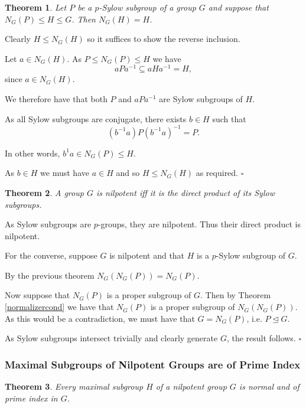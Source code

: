 \documentclass[10pt]{article}
\newtheorem{theorem}{Theorem}[section]
\newenvironment{proof}[1][Proof]{\begin{trivlist}
\item[\hskip \labelsep {\itshape #1}]}{\end{trivlist}}
\begin{document}
\begin{theorem}
Let $P$ be a $p$-Sylow subgroup of a group $G$ and suppose that $N_G(P) \leq H \leq G$. Then $N_G(H) = H$.
\end{theorem}

\begin{proof}
Clearly $H \leq N_G(H)$ so it suffices to show the reverse inclusion.

Let $a \in N_G(H)$. As $P \leq N_G(P) \leq H$ we have
$$aPa^{-1} \subseteq aHa^{-1} = H,$$
since $a \in N_G(H)$.

We therefore have that both $P$ and $aPa^{-1}$ are Sylow subgroups of $H$.

As all Sylow subgroups are conjugate, there exists $b \in H$ such that
$$(b^{-1}a)P(b^{-1}a)^{-1} = P.$$

In other words, $b^{1}a \in N_G(P) \leq H$.

As $b \in H$ we must have $a \in H$ and so $H \leq N_G(H)$ as required. $\square$ 
\end{proof}

\begin{theorem}
A group $G$ is nilpotent iff it is the direct product of its Sylow subgroups.
\end{theorem}

\begin{proof}
As Sylow subgroups are $p$-groups, they are nilpotent. Thus their direct product is nilpotent.

For the converse, suppose $G$ is nilpotent and that $H$ is a $p$-Sylow subgroup of $G$.

By the previous theorem $N_G(N_G(P)) = N_G(P)$.

Now suppose that $N_G(P)$ is a proper subgroup of $G$. Then by Theorem \ref{normalizercond} we have that $N_G(P)$ is a proper subgroup of $N_G(N_G(P))$. As this would be a contradiction, we must have that $G = N_G(P)$, i.e. $P \mathrel{\unlhd} G$.

As Sylow subgroups intersect trivially and clearly generate $G$, the result follows. $\square$
\end{proof}

\subsubsection{Maximal Subgroups of Nilpotent Groups are of Prime Index}

\begin{theorem}
Every maximal subgroup $H$ of a nilpotent group $G$ is normal and of prime index in $G$.
\end{theorem}
\end{document}

